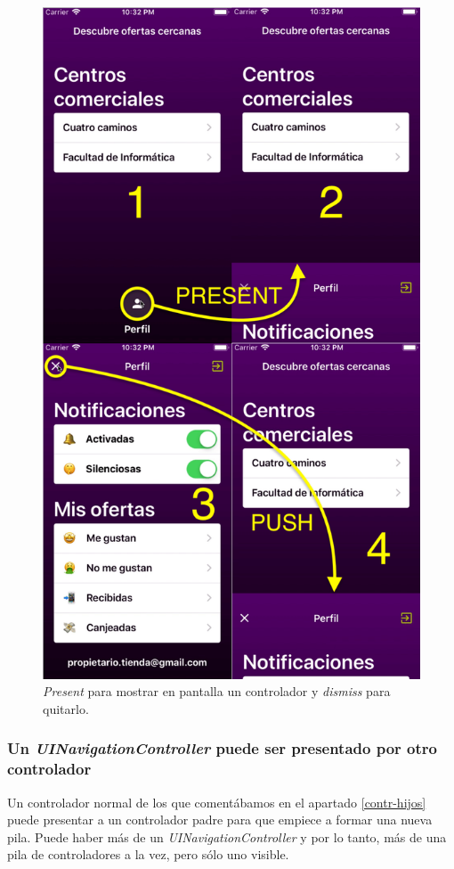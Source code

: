 \begin{figure}[t]
\centering
\includegraphics[scale=0.22]{figures/modal.png}
\caption{\textit{Present} para mostrar en pantalla un controlador y \textit{dismiss} para quitarlo.\label{fig:modal}}
\end{figure}

\subsubsection*{Un \textit{UINavigationController} puede ser presentado por otro controlador}
Un controlador normal de los que comentábamos en el apartado \ref{contr-hijos} puede presentar a un controlador padre para que empiece a formar una nueva pila. Puede haber más de un \textit{UINavigationController} y por lo tanto, más de una pila de controladores a la vez, pero sólo uno visible.

